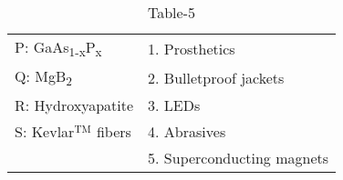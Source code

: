 \begin{table}[htbp]
\centering
\caption{Table-5}
\label{table5}

\begin{tabular}{l l}
P: GaAs\textsubscript{1-x}P\textsubscript{x} & 1. Prosthetics \\
Q: MgB\textsubscript{2} & 2. Bulletproof jackets \\
R: Hydroxyapatite & 3. LEDs \\
S: Kevlar$^\mathrm{TM}$ fibers & 4. Abrasives \\
& 5. Superconducting magnets \\
\end{tabular}

\end{table}